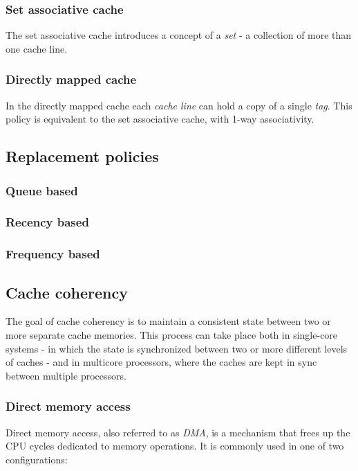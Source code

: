 \subsubsection{Set associative cache}
The set associative cache introduces a concept of a \textit{set} - a collection
of more than one cache line.

\subsubsection{Directly mapped cache}
In the directly mapped cache each \textit{cache line} can hold a copy of
a single \textit{tag}. This policy is equivalent to the set associative cache, with
1-way associativity.

%
\subsection{Replacement policies}
\subsubsection{Queue based}
\subsubsection{Recency based}
\subsubsection{Frequency based}
%
\subsection{Cache coherency}

The goal of cache coherency is to maintain a consistent state between two or
more separate cache memories. This process can take place both in single-core
systems - in which the state is synchronized between two or more different levels of caches
- and in multicore processors, where the caches are kept in sync between multiple
processors.

\pagebreak
\subsubsection{Direct memory access}
Direct memory access, also referred to as \textit{DMA}, is a mechanism that
frees up the CPU cycles dedicated to memory operations. It is commonly used 
in one of two configurations:

